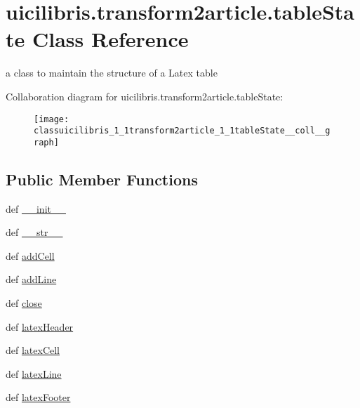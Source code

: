 \hypertarget{classuicilibris_1_1transform2article_1_1tableState}{\section{uicilibris.\-transform2article.\-table\-State \-Class \-Reference}
\label{classuicilibris_1_1transform2article_1_1tableState}
}


a class to maintain the structure of a \-Latex table  




\-Collaboration diagram for uicilibris.\-transform2article.\-table\-State\-:
\nopagebreak
\begin{figure}[H]
\begin{center}
\leavevmode
\texttt{[image: classuicilibris\_1\_1transform2article\_1\_1tableState\_\_coll\_\_graph]}
\end{center}
\end{figure}
\subsection*{\-Public \-Member \-Functions}
\begin{DoxyCompactItemize}
\item 
def \hyperlink{classuicilibris_1_1transform2article_1_1tableState_ae7f114d792ae98a8c301131136b4141a}{\-\_\-\-\_\-init\-\_\-\-\_\-}
\item 
def \hyperlink{classuicilibris_1_1transform2article_1_1tableState_a72e56ce18b2c488345489482916b98ff}{\-\_\-\-\_\-str\-\_\-\-\_\-}
\item 
def \hyperlink{classuicilibris_1_1transform2article_1_1tableState_aec6897f665d96b8c9d410269b35d8ece}{add\-Cell}
\item 
def \hyperlink{classuicilibris_1_1transform2article_1_1tableState_ac9dd1cdc92308ea7b88c55ff2535a059}{add\-Line}
\item 
def \hyperlink{classuicilibris_1_1transform2article_1_1tableState_ae2f280ceeebf7fd59fb31a929856fbe5}{close}
\item 
def \hyperlink{classuicilibris_1_1transform2article_1_1tableState_ad670ec501ced5639f70e0fbfc00d2853}{latex\-Header}
\item 
def \hyperlink{classuicilibris_1_1transform2article_1_1tableState_a6abbfe888873bc40fe24785cad3d270a}{latex\-Cell}
\item 
def \hyperlink{classuicilibris_1_1transform2article_1_1tableState_a1759d75531d377da045ef0b7076d4721}{latex\-Line}
\item 
def \hyperlink{classuicilibris_1_1transform2article_1_1tableState_acbf35223c34bf17980f22409da5d33e4}{latex\-Footer}
\end{DoxyCompactItemize}

